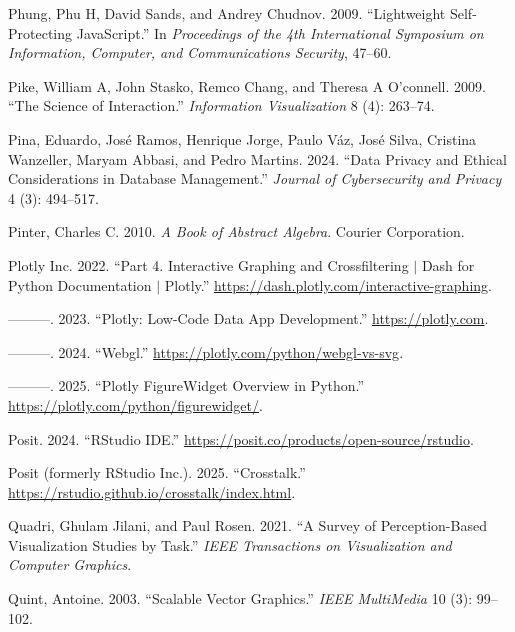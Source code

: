 \documentclass[
  openany]{book}
\newlength{\cslhangindent}
\newenvironment{CSLReferences}[2] %
 {\begin{list}{}{%
  \setlength{\itemindent}{0pt}
  \setlength{\leftmargin}{0pt}
  \setlength{\parsep}{0pt}
  \ifodd #1
   \setlength{\leftmargin}{\cslhangindent}
   \setlength{\itemindent}{-1\cslhangindent}
  \fi
  \setlength{\itemsep}{#2\baselineskip}}}
 {\end{list}}
\theoremstyle{definition}
\theoremstyle{definition}
\theoremstyle{definition}
\theoremstyle{definition}
\theoremstyle{remark}
\begin{document}
\begin{CSLReferences}{1}{0}
Phung, Phu H, David Sands, and Andrey Chudnov. 2009. {``Lightweight Self-Protecting JavaScript.''} In \emph{Proceedings of the 4th International Symposium on Information, Computer, and Communications Security}, 47--60.

Pike, William A, John Stasko, Remco Chang, and Theresa A O'connell. 2009. {``The Science of Interaction.''} \emph{Information Visualization} 8 (4): 263--74.

Pina, Eduardo, José Ramos, Henrique Jorge, Paulo Váz, José Silva, Cristina Wanzeller, Maryam Abbasi, and Pedro Martins. 2024. {``Data Privacy and Ethical Considerations in Database Management.''} \emph{Journal of Cybersecurity and Privacy} 4 (3): 494--517.

Pinter, Charles C. 2010. \emph{A Book of Abstract Algebra}. Courier Corporation.

Plotly Inc. 2022. {``{Part 4. Interactive Graphing and Crossfiltering {\(\vert\)} Dash for Python Documentation {\(\vert\)} Plotly}.''} \url{https://dash.plotly.com/interactive-graphing}.

---------. 2023. {``{Plotly: Low-Code Data App Development}.''} \url{https://plotly.com}.

---------. 2024. {``Webgl.''} \url{https://plotly.com/python/webgl-vs-svg}.

---------. 2025. {``{Plotly FigureWidget Overview in Python}.''} \url{https://plotly.com/python/figurewidget/}.

Posit. 2024. {``{RStudio IDE}.''} \url{https://posit.co/products/open-source/rstudio}.

Posit (formerly RStudio Inc.). 2025. {``{Crosstalk}.''} \url{https://rstudio.github.io/crosstalk/index.html}.

Quadri, Ghulam Jilani, and Paul Rosen. 2021. {``A Survey of Perception-Based Visualization Studies by Task.''} \emph{IEEE Transactions on Visualization and Computer Graphics}.

Quint, Antoine. 2003. {``Scalable Vector Graphics.''} \emph{IEEE MultiMedia} 10 (3): 99--102.


\end{CSLReferences}
\end{document}
